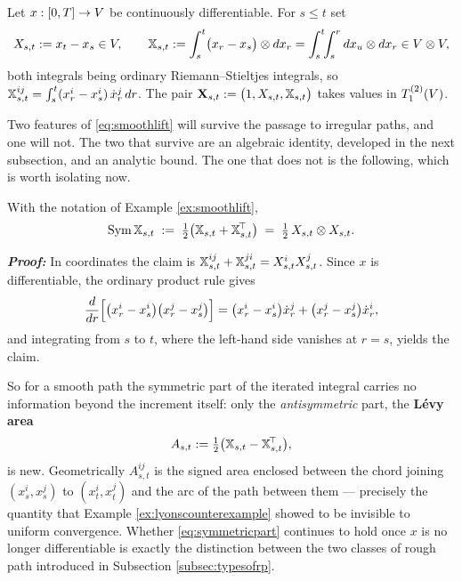 \begin{example}\label{ex:smoothlift}
Let $x : [0,T]\to V$ be continuously differentiable. For $s \leq t$ set
\begin{equation}\label{eq:smoothlift}
X_{s,t} := x_t - x_s \in V, \qquad
\mathbb{X}_{s,t} := \int_s^t \bigl(x_r - x_s\bigr)\otimes d x_r = \int_s^t\!\!\int_s^r d x_u \otimes d x_r \in V\otimes V,
\end{equation}
both integrals being ordinary Riemann--Stieltjes integrals, so
$\mathbb{X}^{ij}_{s,t} = \int_s^t (x^i_r - x^i_s)\,\dot x^j_r\,d r$. The pair
$\mathbf{X}_{s,t} := \bigl(1, X_{s,t}, \mathbb{X}_{s,t}\bigr)$ takes values in $T_{1}^{(2)}(V)$.
\end{example}

Two features of \eqref{eq:smoothlift} will survive the passage to irregular paths, and one will not.
The two that survive are an algebraic identity, developed in the next subsection, and an analytic
bound. The one that does not is the following, which is worth isolating now.

\begin{proposition}\label{prop:symmetricpart}
With the notation of Example \ref{ex:smoothlift},
\begin{equation}\label{eq:symmetricpart}
\operatorname{Sym} \mathbb{X}_{s,t} \;:=\; \tfrac12\bigl(\mathbb{X}_{s,t} + \mathbb{X}_{s,t}^{\!\top}\bigr) \;=\; \tfrac12\,X_{s,t}\otimes X_{s,t}.
\end{equation}
\end{proposition}

\textbf{\textit{Proof:}} In coordinates the claim is
$\mathbb{X}^{ij}_{s,t} + \mathbb{X}^{ji}_{s,t} = X^i_{s,t}X^j_{s,t}$. Since $x$ is differentiable, the ordinary
product rule gives
\[
\frac{d}{d r}\Bigl[ \bigl(x^i_r - x^i_s\bigr)\bigl(x^j_r-x^j_s\bigr) \Bigr]
= \bigl(x^i_r-x^i_s\bigr)\dot x^j_r + \bigl(x^j_r-x^j_s\bigr)\dot x^i_r ,
\]
and integrating from $s$ to $t$, where the left-hand side vanishes at $r=s$, yields the claim. \qedfilledtext

\medskip

So for a smooth path the symmetric part of the iterated integral carries no information beyond the
increment itself: only the \emph{antisymmetric} part, the \textbf{Lévy area}
\begin{equation}\label{eq:levyarea}
A_{s,t} := \tfrac12\bigl(\mathbb{X}_{s,t} - \mathbb{X}_{s,t}^{\!\top}\bigr),
\end{equation}
is new. Geometrically $A^{ij}_{s,t}$ is the signed area enclosed between the chord joining
$(x^i_s,x^j_s)$ to $(x^i_t,x^j_t)$ and the arc of the path between them --- precisely the quantity
that Example \ref{ex:lyonscounterexample} showed to be invisible to uniform convergence. Whether
\eqref{eq:symmetricpart} continues to hold once $x$ is no longer differentiable is exactly the
distinction between the two classes of rough path introduced in Subsection \ref{subsec:typesofrp}.

